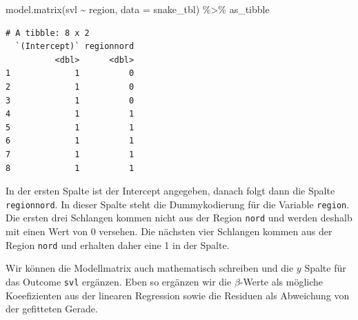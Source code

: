 \documentclass[
  letterpaper,
]{scrbook}
\newenvironment{Shaded}{\begin{snugshade}}{\end{snugshade}}
\newcommand{\AttributeTok}[1]{\textcolor[rgb]{0.40,0.45,0.13}{#1}}
\newcommand{\FunctionTok}[1]{\textcolor[rgb]{0.28,0.35,0.67}{#1}}
\newcommand{\NormalTok}[1]{\textcolor[rgb]{0.00,0.23,0.31}{#1}}
\newcommand{\SpecialCharTok}[1]{\textcolor[rgb]{0.37,0.37,0.37}{#1}}
\begin{document}
\begin{Shaded}
\begin{Highlighting}[]
\FunctionTok{model.matrix}\NormalTok{(svl }\SpecialCharTok{\textasciitilde{}}\NormalTok{ region, }\AttributeTok{data =}\NormalTok{ snake\_tbl) }\SpecialCharTok{\%\textgreater{}\%}\NormalTok{ as\_tibble}
\end{Highlighting}
\end{Shaded}

\begin{verbatim}
# A tibble: 8 x 2
  `(Intercept)` regionnord
          <dbl>      <dbl>
1             1          0
2             1          0
3             1          0
4             1          1
5             1          1
6             1          1
7             1          1
8             1          1
\end{verbatim}

In der ersten Spalte ist der Intercept angegeben, danach folgt dann die
Spalte \texttt{regionnord}. In dieser Spalte steht die Dummykodierung
für die Variable \texttt{region}. Die ersten drei Schlangen kommen nicht
aus der Region \texttt{nord} und werden deshalb mit einen Wert von 0
versehen. Die nächsten vier Schlangen kommen aus der Region
\texttt{nord} und erhalten daher eine 1 in der Spalte.

Wir können die Modellmatrix auch mathematisch schreiben und die \(y\)
Spalte für das Outcome \texttt{svl} ergänzen. Eben so ergänzen wir die
\(\beta\)-Werte als mögliche Koeefizienten aus der linearen Regression
sowie die Residuen als Abweichung von der gefitteten Gerade.
\end{document}
